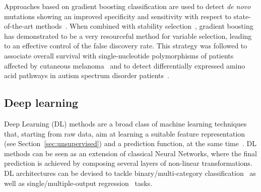     Approaches based on gradient boosting classification are used to detect \textit{de novo} mutations showing an improved specificity and sensitivity with respect to state-of-the-art methods~\citep{liu2014gradient}.
    When combined with stability selection~\citep{meinshausen2010stability}, gradient boosting has demonstrated to be a very resourceful method for variable selection, leading to an effective control of the false discovery rate. This strategy was followed to associate overall survival with single-nucleotide polymorphisms of patients affected by cutaneous melanoma~\citep{he2016component} and to detect differentially expressed amino acid pathways in autism spectrum disorder patients~\citep{hofner2015controlling}.







    \subsection{Deep learning}
    Deep Learning (DL) methods are a broad class of machine learning techniques that, starting from raw data, aim at learning a suitable feature representation (see Section~\ref{sec:unsupervised}) and a prediction function, at the same time~\cite{lecun2015deep}. DL methods can be seen as an extension of classical Neural Networks, where the final prediction is achieved by composing several layers of non-linear transformations.
    DL architectures can be devised to tackle binary/multi-category classification~\cite{angermueller2016deep, leung2014deep} as well as single/multiple-output regression~\cite{Chen2016GeneEI, ma2015deep} tasks.

